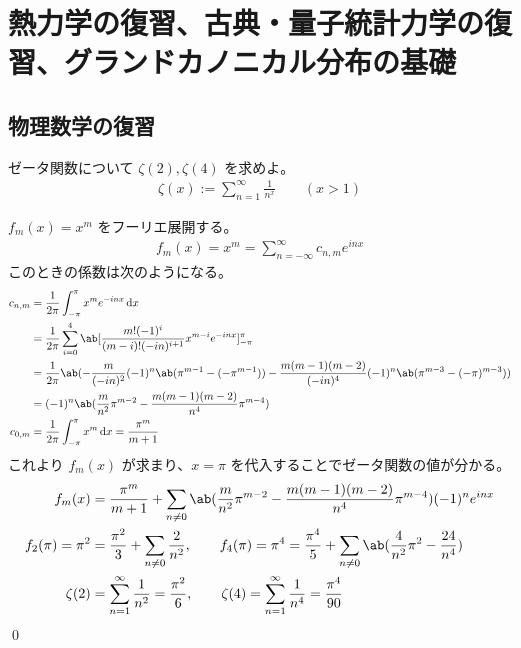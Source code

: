 \documentclass[uplatex,dvipdfmx,a4paper,11pt]{jlreq}
\title{}
\author{anko9801}
\makeatletter
\numberwithin{equation}{section}
\theoremstyle{definition}
\renewenvironment{proof}[1][\proofname]{\par
  \normalfont
  \topsep6\p@\@plus6\p@ \trivlist
  \item[\hskip\labelsep{\bfseries #1}\@addpunct{\bfseries}]\ignorespaces\quad\par
}{%
  \qed\endtrivlist\@endpefalse
}
\renewcommand\proofname{証明}
\makeatother
\begin{document}
\maketitle
\tableofcontents
\clearpage

\section{熱力学の復習、古典・量子統計力学の復習、グランドカノニカル分布の基礎}
\setcounter{subsection}{3}
\subsection{物理数学の復習}
\begin{problem}
ゼータ関数について $\zeta(2), \zeta(4)$ を求めよ。
\begin{align}
  \zeta(x) := \sum_{n=1}^{\infty}\frac{1}{n^x} \qquad (x > 1)
\end{align}
\end{problem}
\begin{proof}
  $f_m(x) = x^m$ をフーリエ展開する。
  \begin{align}
    f_m(x) = x^m = \sum_{n=-\infty}^{\infty}c_{n,m}e^{inx}
  \end{align}
  このときの係数は次のようになる。
  \begin{align}
    c_{n,m} & = \frac{1}{2\pi}\int_{-\pi}^{\pi}x^me^{-inx}\dl{x}                                                                                              \\
            & = \frac{1}{2\pi}\sum_{i=0}^{4}\ab[\frac{m!(-1)^i}{(m-i)!(-in)^{i+1}}x^{m-i}e^{-inx}]_{-\pi}^{\pi}                                               \\
            & = \frac{1}{2\pi}\ab(-\frac{m}{(-in)^{2}}(-1)^n\ab(\pi^{m-1} - (-\pi^{m-1})) - \frac{m(m-1)(m-2)}{(-in)^{4}}(-1)^n\ab(\pi^{m-3} - (-\pi)^{m-3})) \\
            & = (-1)^n\ab(\frac{m}{n^2}\pi^{m-2} - \frac{m(m-1)(m-2)}{n^4}\pi^{m-4})                                                                          \\
    c_{0,m} & = \frac{1}{2\pi}\int_{-\pi}^\pi x^m\dl{x} = \frac{\pi^m}{m+1}
  \end{align}
  これより $f_m(x)$ が求まり、$x = \pi$ を代入することでゼータ関数の値が分かる。
  \begin{align}
    f_m(x)           & = \frac{\pi^m}{m+1} + \sum_{n\neq 0}\ab(\frac{m}{n^2}\pi^{m-2} - \frac{m(m-1)(m-2)}{n^4}\pi^{m-4})(-1)^ne^{inx}                                     \\
    f_2(\pi) = \pi^2 & = \frac{\pi^2}{3} + \sum_{n\neq 0}\frac{2}{n^2}, \qquad f_4(\pi) = \pi^4 = \frac{\pi^4}{5} + \sum_{n\neq 0}\ab(\frac{4}{n^2}\pi^2 - \frac{24}{n^4}) \\
    \zeta(2)         & = \sum_{n=1}^\infty\frac{1}{n^2} = \frac{\pi^2}{6}, \qquad \zeta(4) = \sum_{n=1}^\infty\frac{1}{n^4} = \frac{\pi^4}{90}
  \end{align}
\end{proof}
\end{document}
